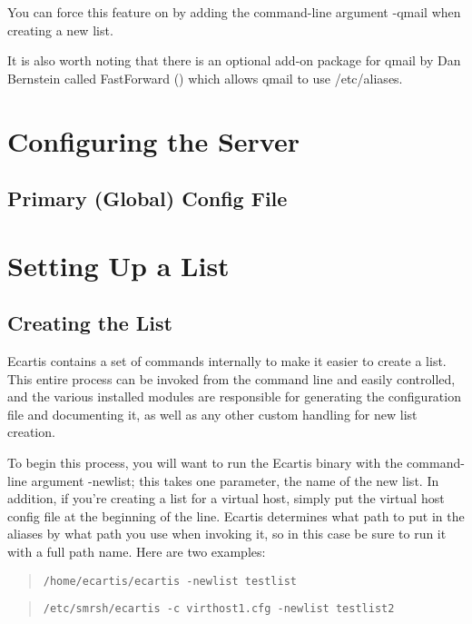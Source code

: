 \documentclass{book}
\begin{document}
You can force this feature on by adding the command-line argument -qmail when
creating a new list.
   
It is also worth noting that there is an optional add-on package for qmail by
Dan Bernstein called FastForward
() which allows qmail to use
/etc/aliases.
   
\chapter{Configuring the Server}
\label{configuring}

\section{Primary (Global) Config File}
\label{configuring:global}

   
\chapter{Setting Up a List}
\label{newlist}

\section{Creating the List}
\label{newlist:create}

Ecartis contains a set of commands internally to make it easier to create a
list. This entire process can be invoked from the command line and easily
controlled, and the various installed modules are responsible for generating
the configuration file and documenting it, as well as any other custom
handling for new list creation.
   
To begin this process, you will want to run the Ecartis binary with the
command-line argument -newlist; this takes one parameter, the name of the new
list. In addition, if you're creating a list for a virtual host, simply put
the virtual host config file at the beginning of the line. Ecartis determines
what path to put in the aliases by what path you use when invoking it, so in
this case be sure to run it with a full path name. Here are two examples:

\begin{quote} 
\footnotesize
\begin{verbatim}
/home/ecartis/ecartis -newlist testlist
\end{verbatim}
\end{quote}

\begin{quote}
\footnotesize
\begin{verbatim}
/etc/smrsh/ecartis -c virthost1.cfg -newlist testlist2
\end{verbatim}
\end{quote}
   
\end{document}
